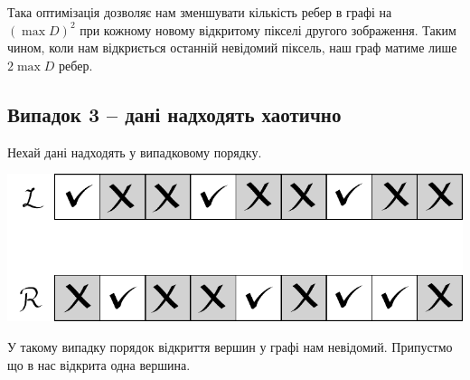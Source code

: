 \documentclass{ConfFTI}
\begin{document}
Така оптимізація дозволяє нам зменшувати кількість ребер в графі на  $(\max{D})^2$ при кожному новому відкритому пікселі другого зображення. Таким чином, коли нам відкриється останній невідомий піксель, наш граф матиме лише $2 \max{D}$ ребер.

\subsection{Випадок 3 -- дані надходять хаотично} 

Нехай дані надходять у випадковому порядку.

\begin{center}
\includegraphics[scale = 0.5]{chaotic.pdf}
\end{center}
	
У такому випадку порядок відкриття вершин у графі нам невідомий. Припустмо що в нас відкрита одна вершина.
	
\end{document}

